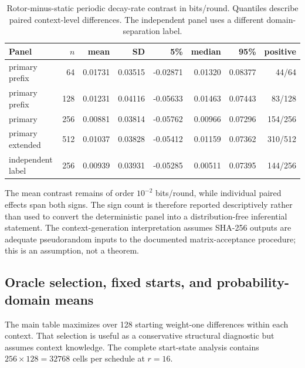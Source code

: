\documentclass[cryptography,supfile,submit,oneauthor]{Definitions/mdpi}
\begin{document}
\begin{table}[h]
\centering\small
\caption{Rotor-minus-static periodic decay-rate contrast in bits/round. Quantiles describe paired context-level differences. The independent panel uses a different domain-separation label.}
\begin{tabular}{lrrrrrrr}
\toprule
Panel & $n$ & mean & SD & 5\% & median & 95\% & positive\\
\midrule
primary prefix & 64  & 0.01731 & 0.03515 & -0.02871 & 0.01320 & 0.08377 & 44/64\\
primary prefix & 128 & 0.01231 & 0.04116 & -0.05633 & 0.01463 & 0.07443 & 83/128\\
primary & 256 & 0.00881 & 0.03814 & -0.05762 & 0.00966 & 0.07296 & 154/256\\
primary extended & 512 & 0.01037 & 0.03828 & -0.05412 & 0.01159 & 0.07362 & 310/512\\
independent label & 256 & 0.00939 & 0.03931 & -0.05285 & 0.00511 & 0.07395 & 144/256\\
\bottomrule
\end{tabular}
\end{table}

The mean contrast remains of order $10^{-2}$ bits/round, while individual paired effects span both signs. The sign count is therefore reported descriptively rather than used to convert the deterministic panel into a distribution-free inferential statement. The context-generation interpretation assumes SHA-256 outputs are adequate pseudorandom inputs to the documented matrix-acceptance procedure; this is an assumption, not a theorem.

\subsection{Oracle selection, fixed starts, and probability-domain means}
The main table maximizes over 128 starting weight-one differences within each context. That selection is useful as a conservative structural diagnostic but assumes context knowledge. The complete start-state analysis contains $256\times128=32768$ cells per schedule at $r=16$.
\end{document}
